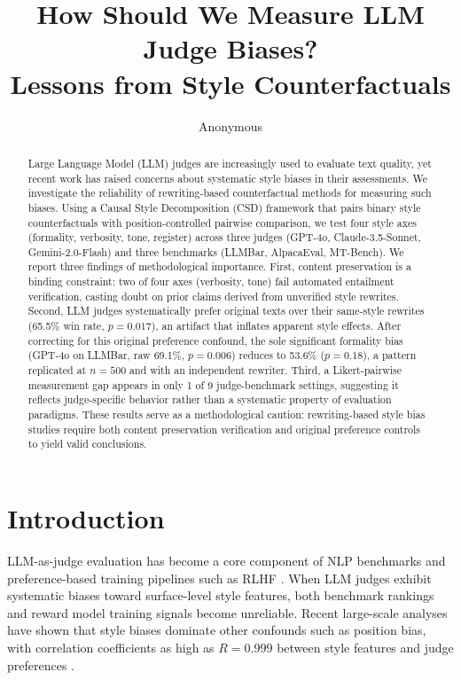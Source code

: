 \documentclass[11pt,a4paper]{article}
\title{How Should We Measure LLM Judge Biases? \\
Lessons from Style Counterfactuals}
\author{Anonymous}
\date{}
\begin{document}
\maketitle

\begin{abstract}
Large Language Model (LLM) judges are increasingly used to evaluate text quality, yet recent work has raised concerns about systematic style biases in their assessments.
We investigate the reliability of rewriting-based counterfactual methods for measuring such biases.
Using a Causal Style Decomposition (CSD) framework that pairs binary style counterfactuals with position-controlled pairwise comparison, we test four style axes (formality, verbosity, tone, register) across three judges (GPT-4o, Claude-3.5-Sonnet, Gemini-2.0-Flash) and three benchmarks (LLMBar, AlpacaEval, MT-Bench).
We report three findings of methodological importance.
First, content preservation is a binding constraint: two of four axes (verbosity, tone) fail automated entailment verification, casting doubt on prior claims derived from unverified style rewrites.
Second, LLM judges systematically prefer original texts over their same-style rewrites (65.5\% win rate, $p=0.017$), an artifact that inflates apparent style effects.
After correcting for this original preference confound, the sole significant formality bias (GPT-4o on LLMBar, raw 69.1\%, $p=0.006$) reduces to 53.6\% ($p=0.18$), a pattern replicated at $n=500$ and with an independent rewriter.
Third, a Likert-pairwise measurement gap appears in only 1 of 9 judge-benchmark settings, suggesting it reflects judge-specific behavior rather than a systematic property of evaluation paradigms.
These results serve as a methodological caution: rewriting-based style bias studies require both content preservation verification and original preference controls to yield valid conclusions.
\end{abstract}

\section{Introduction}

LLM-as-judge evaluation has become a core component of NLP benchmarks and preference-based training pipelines such as RLHF \citep{ouyang2022training}.
When LLM judges exhibit systematic biases toward surface-level style features, both benchmark rankings and reward model training signals become unreliable.
Recent large-scale analyses have shown that style biases dominate other confounds such as position bias, with correlation coefficients as high as $R=0.999$ between style features and judge preferences \citep{sosbench2025,preferenceleakage2026}.
\end{document}
